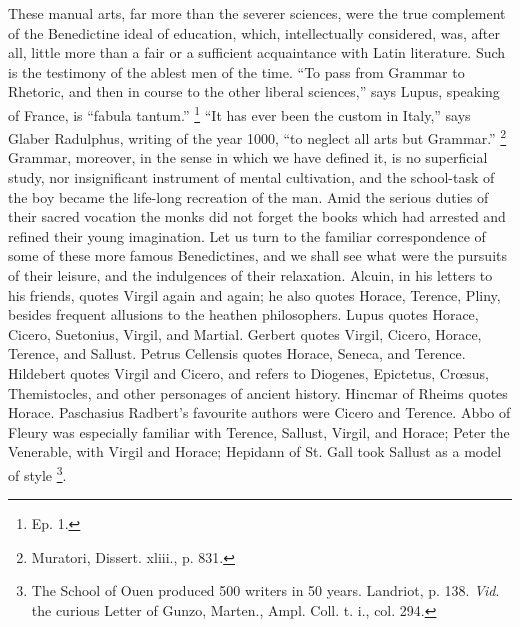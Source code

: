 These manual arts, far more than the severer sciences, were the
true complement of the Benedictine ideal of education, which,
intellectually considered, was, after all, little more than a fair or
a sufficient acquaintance with Latin literature. Such is the testimony
of the ablest men of the time. ``To pass from Grammar to Rhetoric,
and then in course to the other liberal sciences,'' says Lupus,
speaking of France, is ``fabula tantum.'' \footnote{Ep. 1.} ``It has ever been the custom in Italy,'' says Glaber
Radulphus, writing of the year 1000, ``to neglect all arts but
Grammar.'' \footnote{Muratori,
Dissert. xliii., p. 831.}
Grammar, moreover, in the sense in which we have defined it, is no
superficial study, nor insignificant instrument of mental cultivation,
and the school-task of the boy became the life-long recreation of the
man. Amid the serious duties of their sacred vocation the monks did
not forget the books which had arrested and refined their young
imagination. Let us turn to the familiar correspondence of some of
these more famous Benedictines, and we shall see what were the
pursuits of their leisure, and the indulgences of their relaxation.
Alcuin, in his letters to his friends, quotes Virgil again and
again; he also quotes Horace, Terence, Pliny, besides frequent
allusions to the heathen philosophers. Lupus quotes Horace, Cicero,
Suetonius, Virgil, and Martial. Gerbert quotes Virgil, Cicero, Horace,
Terence, and Sallust. Petrus Cellensis quotes Horace, Seneca, and
Terence. Hildebert quotes Virgil and Cicero, and refers to Diogenes,
Epictetus, Crœsus, Themistocles, and other personages of ancient
history. Hincmar of Rheims quotes Horace. Paschasius Radbert's
favourite authors were Cicero and Terence. Abbo of Fleury was
especially familiar with Terence, Sallust, Virgil, and Horace; Peter
the Venerable, with Virgil and Horace; Hepidann of St. Gall took
Sallust as a model of style \footnote{The School of
Ouen produced 500 writers in 50 years. Landriot, p. 138. \emph{Vid}.
the curious Letter of Gunzo, Marten., Ampl. Coll. t. i., col. 294.}.

